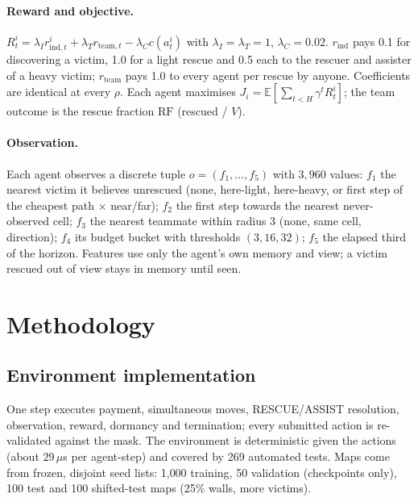 \documentclass{article}
\newcommand{\RF}{\mathrm{RF}}
\begin{document}
\paragraph{Reward and objective.}
$R^i_t=\lambda_I r^i_{\mathrm{ind},t}+\lambda_T r_{\mathrm{team},t}-\lambda_C c(a^i_t)$ with $\lambda_I=\lambda_T=1$,
$\lambda_C=0.02$. $r_{\mathrm{ind}}$ pays 0.1 for discovering a victim, 1.0 for a light rescue and 0.5 each to the
rescuer and assister of a heavy victim; $r_{\mathrm{team}}$ pays 1.0 to every agent per rescue by anyone. Coefficients
are identical at every $\rho$. Each agent maximises $J_i=\mathbb{E}[\sum_{t<H}\gamma^t R^i_t]$; the team outcome is the
rescue fraction $\RF$ (rescued / $V$).

\paragraph{Observation.} Each agent observes a discrete tuple $o=(f_1,\dots,f_5)$ with $3{,}960$ values: $f_1$ the
nearest victim it believes unrescued (none, here-light, here-heavy, or first step of the cheapest path $\times$
near/far); $f_2$ the first step towards the nearest never-observed cell; $f_3$ the nearest teammate within radius 3
(none, same cell, direction); $f_4$ its budget bucket with thresholds $(3,16,32)$; $f_5$ the elapsed third of the
horizon. Features use only the agent's own memory and view; a victim rescued out of view stays in memory until seen.

\section{Methodology}
\subsection{Environment implementation}
One step executes payment, simultaneous moves, RESCUE/ASSIST resolution, observation, reward, dormancy and termination;
every submitted action is re-validated against the mask. The environment is deterministic given the actions (about
$29\,\mu$s per agent-step) and covered by 269 automated tests. Maps come from frozen, disjoint seed lists: 1{,}000
training, 50 validation (checkpoints only), 100 test and 100 shifted-test maps (25\% walls, more victims).
\end{document}
